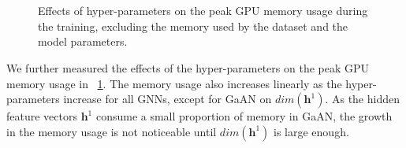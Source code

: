 \begin{figure}[tbp]
    \centering
    \\
    \\
    \caption{Effects of hyper-parameters on the peak GPU memory usage during the training, excluding the memory used by the dataset and the model parameters.}
    \label{fig:exp_hyperparameter_memory_usage}
\end{figure}

We further measured the effects of the hyper-parameters on the peak GPU memory usage in \figurename~\ref{fig:exp_hyperparameter_memory_usage}.
The memory usage also increases linearly as the hyper-parameters increase for all GNNs, except for GaAN on $dim(\boldsymbol{h}^1)$.
As the hidden feature vectors $\boldsymbol{h}^1$ consume a small proportion of memory in GaAN, the growth in the memory usage is not noticeable until $dim(\boldsymbol{h}^1)$ is large enough.

